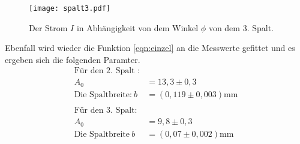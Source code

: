 \begin{figure}
  \centering
  \texttt{[image: spalt3.pdf]}
  \caption{ Der Strom $I$ in Abhängigkeit von dem Winkel $\phi$ von dem 3. Spalt.}
  \label{fig:spalt3}
\end{figure}
\FloatBarrier
Ebenfall wird wieder die Funktion \eqref{eqn:einzel}
an die Messwerte gefittet und es ergeben sich die folgenden Paramter.
\begin{align*}
  \text{Für den 2. Spalt :}\\
  A_0&=13,3\pm0,3\\
\text{Die Spaltbreite:} \ b&=(0,119\pm0,003)\si{\milli\meter}\\
\\
\text{Für den 3. Spalt:}\\
  A_0&=9,8\pm0,3\\
  \text{Die Spaltbreite}\ b&=(0,07\pm0,002)\si{\milli\meter}\\
\end{align*}

